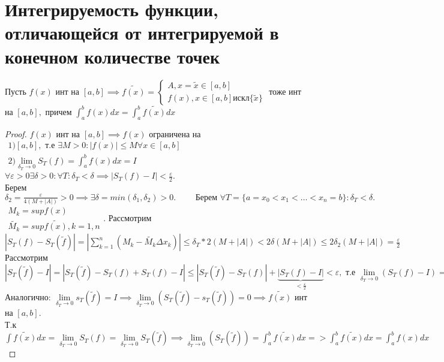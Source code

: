 \documentclass[../main.tex]{subfiles}
\begin{document}
\section{Интегрируемость функции, отличающейся от интегрируемой в конечном количестве точек} 
\begin{theorem}
    Пусть $f(x)$ инт на $[a,b]\implies \tilde{f(x)}=\begin{cases}
        A, x=\tilde{x}\in[a,b]\\ 
        f(x),x\in[a,b] \text{искл}  \{\tilde{x}\}
    \end{cases}$ тоже инт на $[a,b],$ причем $\int _{a}^{b}f(x)dx=\int _{a}^{b}\tilde{f(x)}dx$
\end{theorem}
\begin{proof}
    $f(x)$ инт на $[a,b]\implies f(x)$ ограничена на $\begin{aligned}1)[a,b],\text{ т.е } \exists M>0:|f(x)|\leqslant M \forall x\in[a,b] \\ 2)\lim\limits_{\delta_{T}\to 0}  S_{T}(f)=\int _{a}^{b}f(x)dx=I\end{aligned}$ \\ 
    $\forall \varepsilon>0 \exists \delta>0: \forall T: \delta_{T}<\delta \implies|S_{T}(f)-I|<\frac{\varepsilon}{2}.$\\
    Берем $\delta_{2}=\frac{\varepsilon}{4(M+|A|)}>0 \implies \exists \delta=min(\delta_{1},\delta_{2})>0.\qquad \text{ Берем } \forall T=\{a=x_{0}<x_{1}<\dots<x_{n}=b\}: \delta_{T}<\delta.$ \\ 
    $\begin{aligned}
        M_{k}=supf(x) \\ 
        \tilde{M_{k}}=sup\tilde{f(x)}, k=1,n
    \end{aligned}$. Рассмотрим $|S_{T}(f)-S_{T}(\tilde{f})|=|\sum_{k=1}^{n}(M_{k}-\tilde{M_{k}}\Delta x_{k})|\leqslant \delta_{T}*2 (M+|A|)<2\delta(M+|A|)\leqslant 2\delta_{2}(M+|A|)=\frac{\varepsilon}{2}$ \\ 
    Рассмотрим $|S_{T}(\tilde{f})-I|=|S_{T}(\tilde{f})-S_{T}(f)+S_{T}(f)-I|\leqslant |S_{T}(\tilde{f})-S_{T}(f)|+\underbrace{|S_{T}(f)-I|}_{<\frac{\varepsilon}{2}}<\varepsilon,\text{ т.е } \lim\limits_{\delta_{T}\to 0}(S_{T}(f)-I)=0\implies\lim\limits_{\delta_{T}\to 0}S(\tilde{f})=I$\\ 
    Аналогично: $\lim\limits_{\delta_{T}\to 0}s_{T}(\tilde{f})=I \implies \lim\limits_{\delta_{T}\to 0} (S_{T}(\tilde{f})-s_{T}(\tilde{f}))=0\implies \tilde{f(x)} $ инт на $[a,b]$. \\ 
    Т.к $\int \tilde{f(x)}dx=\lim\limits_{\delta_{T}\to 0}S_{T}(f)=\lim\limits_{\delta_{T}\to 0}S_{T}(\tilde{f})\implies \lim\limits_{\delta_{T}\to 0}(S_{T}(\tilde{f}))=\int _{a}^{b}\tilde{f(x)}dx=> \int _{a}^{b}\tilde{f(x)}dx=\int _{a}^{b}f(x)dx    $
\end{proof}
\end{document}

